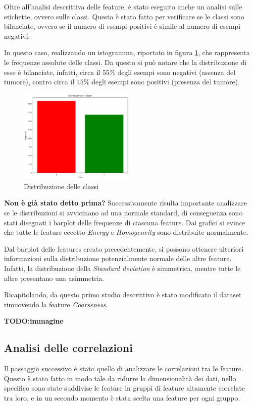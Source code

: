 Oltre all'analisi descrittiva delle feature, è stato eseguito anche un analisi
sulle etichette, ovvero sulle classi. Questo è stato fatto per verificare se le
classi sono bilanciate, ovvero se il numero di esempi positivi è simile al numero
di esempi negativi.

In questo caso, realizzando un istogramma, riportato in figura \ref{fig:dist-classi},
che rappresenta le frequenze assolute delle classi. Da questo si può notare che 
la distribuzione di esse è bilanciate, infatti, circa il $55\%$ degli esempi sono 
negativi (assenza del tumore), contro circa il $45\%$ degli esempi sono positivi 
(presenza del tumore).

\begin{figure}[!ht]
    \centering
    \includegraphics[width=0.5\textwidth]{img/analisi/distribuzioneClassi.png}
    \caption{Distribuzione delle classi}
    \label{fig:dist-classi}
\end{figure}

\textbf{Non è già stato detto prima?}
Successivamente risulta importante analizzare se le distribuzioni si avvicinano
ad una normale standard, di conseguenza sono stati disegnati i barplot delle frequenze
di ciascuna feature. Dai grafici si evince che tutte le feature eccetto \textit{Energy} e
\textit{Homogeneity} sono distribuite normalmente.

Dal barplot delle features creato precedentemente, si possono ottenere ulteriori
informazioni sulla distribuzione potenzialmente normale delle altre feature. Infatti,
la distribuzione della \textit{Standard deviation} è simmetrica, mentre tutte
le altre presentano una asimmetria.

Ricapitolando, da questo primo studio descrittivo è stato modificato il dataset
rimuovendo la feature \textit{Coarseness}.

\textbf{TODO:immagine}

\subsection{Analisi delle correlazioni}
Il passaggio successivo è  stato quello di analizzare le correlazioni tra le feature. 
Questo è stato fatto in modo tale da ridurre la dimensionalità dei dati, nello 
specifico sono state suddivise le feature in gruppi di feature altamente correlate 
tra loro, e in un secondo momento è stata scelta una feature per ogni gruppo.

